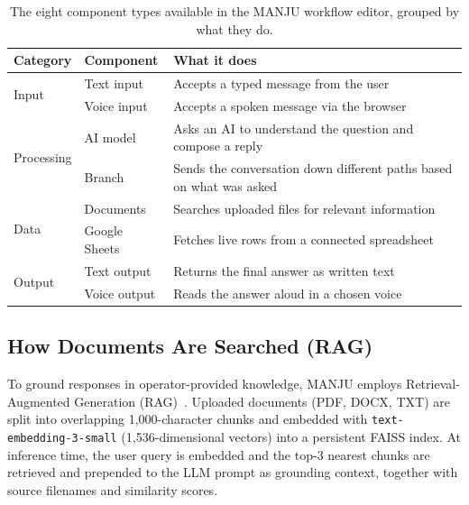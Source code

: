 \documentclass[10pt, a4paper, twocolumn]{article}
\begin{document}
\begin{table}[t]
    \centering
    \caption{The eight component types available in the MANJU workflow
             editor, grouped by what they do.}
    \label{tab:node_types}
    \small
    \begin{tabular}{@{}llp{3.8cm}@{}}
        \toprule
        \textbf{Category} & \textbf{Component} & \textbf{What it does} \\
        \midrule
        \multirow{2}{*}{Input}
          & Text input   & Accepts a typed message from the user \\
          & Voice input  & Accepts a spoken message via the browser \\
        \midrule
        \multirow{2}{*}{Processing}
          & AI model     & Asks an AI to understand the question and compose a reply \\
          & Branch       & Sends the conversation down different paths based on what was asked \\
        \midrule
        \multirow{2}{*}{Data}
          & Documents    & Searches uploaded files for relevant information \\
          & Google Sheets & Fetches live rows from a connected spreadsheet \\
        \midrule
        \multirow{2}{*}{Output}
          & Text output  & Returns the final answer as written text \\
          & Voice output & Reads the answer aloud in a chosen voice \\
        \bottomrule
    \end{tabular}
\end{table}

\subsection{How Documents Are Searched (RAG)}
\label{sec:rag}

To ground responses in operator-provided knowledge, MANJU employs
Retrieval-Augmented Generation (RAG)~\cite{lewis2020rag}.
Uploaded documents (PDF, DOCX, TXT) are split into overlapping
1{,}000-character chunks and embedded with
\texttt{text-embedding-3-small} (1{,}536-dimensional vectors) into a
persistent FAISS index.
At inference time, the user query is embedded and the top-3 nearest
chunks are retrieved and prepended to the LLM prompt as grounding
context, together with source filenames and similarity scores.
\end{document}
